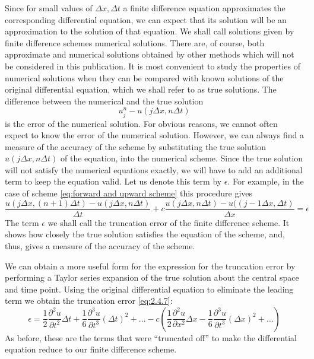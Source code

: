Since for small values of $\Delta x, \Delta t$ a finite difference equation approximates the corresponding differential equation, we can expect that its solution will be an approximation to the solution of that equation. We shall call solutions given by finite difference schemes numerical solutions. There are, of course, both approximate and numerical solutions obtained by other methods which will not be considered in this publication. It is most convenient to study the properties of numerical solutions when they can be compared with known solutions of the original differential equation, which we shall refer to as true solutions. The difference between the numerical and the true solution
\begin{equation}
	u_j^n-u(j\Delta x,n\Delta t)
\end{equation}
is the error of the numerical solution. For obvious reasons, we cannot often expect to know the error of the numerical solution. However, we can always find a measure of the accuracy of the scheme by substituting the true solution $u(j\Delta x, n\Delta t)$ of the equation, into the numerical scheme. Since the true solution will not satisfy the numerical equations exactly, we will have to add an additional term to keep the equation valid. Let us denote this term by $\epsilon$. For example, in the case of scheme \ref{eq:forward and upward scheme} this procedure gives
\begin{equation}\label{eq:2.4.7}
	\frac{u(j\Delta x,(n+1)\Delta t)-u(j\Delta x, n\Delta t)}{\Delta t}+c\frac{u(j\Delta x, n\Delta t)-u((j-1\Delta x, \Delta t)}{\Delta x}=\epsilon
\end{equation}
The term $\epsilon$ we shall call the truncation error of the finite difference scheme. It shows how closely the true solution satisfies the equation of the scheme, and, thus, gives a measure of the accuracy of the scheme.

We can obtain a more useful form for the expression for the truncation error by performing a Taylor series expansion of the true solution about the central space and time point. Using the original differential equation to eliminate the leading term we obtain the truncation error \ref{eq:2.4.7}:
\begin{equation}\label{eq: 2.4.8}
	\epsilon=\frac{1}{2}\frac{\partial^2u}{\partial t^2}\Delta t+\frac{1}{6}\frac{\partial^3u}{\partial t^3}(\Delta t)^2+\dots-c\left(\frac{1}{2}\frac{\partial^2u}{\partial x^2}\Delta x-\frac{1}{6}\frac{\partial^3u}{\partial t^3}(\Delta x)^2+\dots\right)
\end{equation}
As before, these are the terms that were “truncated off” to make the differential equation reduce to our finite difference scheme.

